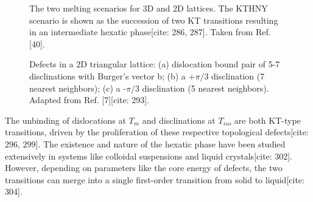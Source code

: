 \documentclass[11pt]{article}
\begin{document}
\begin{figure}[h!]
    \centering
    \caption{The two melting scenarios for 3D and 2D lattices. The KTHNY scenario is shown as the succession of two KT transitions resulting in an intermediate hexatic phase[cite: 286, 287]. Taken from Ref. [40].}
    \label{fig:melting_scenarios}
\end{figure}

\begin{figure}[h!]
    \centering
    \caption{Defects in a 2D triangular lattice: (a) dislocation bound pair of 5-7 disclinations with Burger's vector b; (b) a +$\pi/3$ disclination (7 nearest neighbors); (c) a -$\pi/3$ disclination (5 nearest neighbors). Adapted from Ref. [7][cite: 293].}
    \label{fig:dislocation}
\end{figure}

The unbinding of dislocations at $T_m$ and disclinations at $T_{iso}$ are both KT-type transitions, driven by the proliferation of these respective topological defects[cite: 296, 299]. The existence and nature of the hexatic phase have been studied extensively in systems like colloidal suspensions and liquid crystals[cite: 302]. However, depending on parameters like the core energy of defects, the two transitions can merge into a single first-order transition from solid to liquid[cite: 304].
\end{document}
